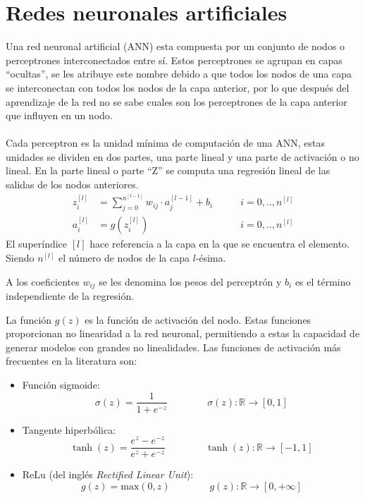 \section{Redes neuronales artificiales} 
 Una red neuronal artificial (ANN) esta compuesta por un conjunto de nodos o perceptrones interconectados entre sí. Estos perceptrones se agrupan en capas ``ocultas'', se les atribuye este nombre debido a que todos los nodos de una capa se interconectan con todos los nodos de la capa anterior, por lo que después del aprendizaje de la red no se sabe cuales son los perceptrones de la capa anterior que influyen en un nodo.
 \\
\\
 Cada perceptron es la unidad mínima de computación de una ANN, estas unidades se dividen en dos partes, una parte lineal y una parte de activación o no lineal. En la parte lineal o parte ``Z'' se computa una regresión lineal de las salidas de los nodos anteriores.
 \begin{align}
 	z^{[l]}_i &= \sum_{j=0}^{n^{[l-1]}} {w_{ij}\cdot a^{[l-1]}_j} + b_i  \qquad &i=0,..,n^{[l]} \\
 	a^{[l]}_i &= g\left(z^{[l]}_i\right) \qquad  &i=0,..,n^{[l]}
 \end{align}
 El superíndice $[l]$ hace referencia a la capa en la que se encuentra el elemento. Siendo $n^{[l]}$ el número de nodos de la capa $l$-ésima.
 
 
 A los coeficientes $w_{ij}$ se les denomina los pesos del perceptrón y $b_i$ es el término independiente de la regresión. 
 
 La función $g(z)$ es la función de activación del nodo. Estas funciones proporcionan no linearidad a la red neuronal, permitiendo a estas la capacidad de generar modelos con grandes no linealidades. Las funciones de activación más frecuentes en la literatura son:
 
 \begin{itemize}
 	\item Función sigmoide: 
 	\begin{equation}
 	\sigma(z) = \frac{1}{1+e^{-z}} \qquad\qquad \sigma(z):\mathbb{R} \rightarrow [0,1]
 	\end{equation}

	\item Tangente hiperbólica: 
	\begin{equation}
	\tanh(z) = \frac{e^z-e^{-z}}{e^z+e^{-z}} \qquad\qquad \tanh(z):\mathbb{R} \rightarrow [-1,1]
	\end{equation}
	
	\item ReLu (del inglés \textit{Rectified Linear Unit}): 
	\begin{equation}
		g(z) = \text{max}(0,z) \qquad\qquad g(z):\mathbb{R} \rightarrow [0,+\infty]
	\end{equation}
	

\end{itemize} 
  
